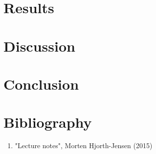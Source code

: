 \documentclass{scrartcl}
\begin{document}
\section{Results}

\section{Discussion}

\section{Conclusion}

\section{Bibliography}
\begin{enumerate}
\item "Lecture notes", Morten Hjorth-Jensen (2015)
\end{enumerate}
\end{document}
